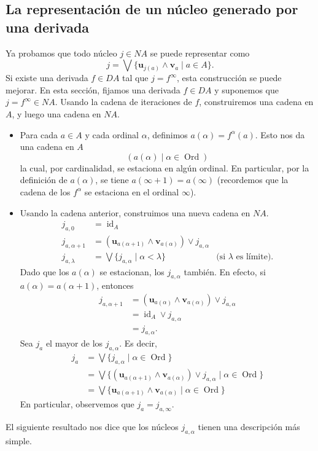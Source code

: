 \documentclass[12pt,letterpaper,titlepage]{article}
\theoremstyle{definition}
\renewcommand\sup{\vee}
\newcommand\Sup{\bigvee}
\renewcommand\inf{\wedge}
\newcommand\unuc[1]{\mathbf u_{#1}}
\newcommand\vnuc[1]{\mathbf v_{#1}}
\newcommand\<{\langle}
\renewcommand\>{\rangle}
\DeclareMathOperator{\Ord}{Ord}
\DeclareMathOperator{\id}{id}
\begin{document}
\subsection{La representación de un núcleo generado por una derivada}

Ya probamos que todo núcleo $j\in NA$ se puede representar como
\[
    j = \Sup\{\unuc{j(a)}\inf \vnuc a \mid a\in A \}
.\]
Si existe una derivada $f\in DA$ tal que $j=f^\infty$,
esta construcción se puede mejorar.
En esta sección, fijamos una derivada $f\in DA$ y suponemos que
$j=f^\infty\in NA$.
Usando la cadena de iteraciones de $f$, construiremos una cadena
en $A$, y luego una cadena en $NA$.
\begin{itemize}
  \item
  Para cada $a\in A$ y cada ordinal $\alpha$, definimos
  $a(\alpha)=f^\alpha(a)$.
  Esto nos da una cadena en $A$
  \[
    (a(\alpha) \mid \alpha\in\Ord)
  \]
  la cual, por cardinalidad, se estaciona en algún ordinal.
  En particular, por la definición de $a(\alpha)$, se tiene
  $a(\infty+1)=a(\infty)$ (recordemos que la cadena de los
  $f^\alpha$ se estaciona en el ordinal $\infty$).
  \item
  Usando la cadena anterior, construimos una nueva cadena en $NA$.
  \begin{align*}
    j_{a,0}
    &= \id_A \\
    j_{a,\alpha+1}
    &= (\unuc {a(\alpha+1)}\inf \vnuc {a(\alpha)})\sup j_{a,\alpha}
    \\
    j_{a,\lambda}
    &= \Sup\{j_{a,\alpha} \mid \alpha < \lambda\}
      & \text{(si $\lambda$ es límite).}
  \end{align*}
  Dado que los $a(\alpha)$ se estacionan, los $j_{a,\alpha}$ también.
  En efecto, si $a(\alpha) = a(\alpha+1)$, entonces
  \begin{align*}
    j_{a,\alpha+1}
    &= (\unuc {a(\alpha)}\inf \vnuc {a(\alpha)})
      \sup j_{a,\alpha} \\
    &= \id_A\sup j_{a,\alpha} \\
    &= j_{a,\alpha}.
  \end{align*}
  Sea $j_a$ el mayor de los $j_{a,\alpha}$.
  Es decir,
  \begin{align*}
    j_a
    &= \Sup\{j_{a,\alpha} \mid \alpha\in\Ord\} \\
    &= \Sup\{(\unuc {a(\alpha+1)}\inf\vnuc {a(\alpha)})
      \sup j_{a,\alpha} \mid \alpha\in\Ord\} \\
    &= \Sup\{\unuc {a(\alpha+1)}\inf\vnuc {a(\alpha)}
    \mid \alpha\in\Ord\}
  \end{align*}
  En particular, observemos que $j_a=j_{a,\infty}$.
\end{itemize}
El siguiente resultado nos dice que los núcleos
$j_{a,\alpha}$ tienen una descripción más simple.
\end{document}
